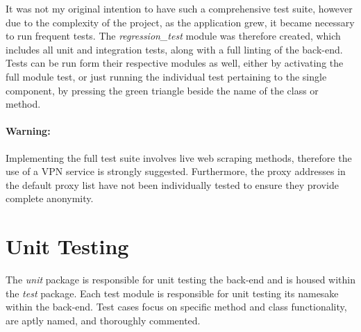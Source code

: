 \documentclass{thesis-ekf}
\theoremstyle{definition}
\theoremstyle{remark}
\begin{document}
It was not my original intention to have such a comprehensive test suite, however due to the complexity of the project, as the application grew, it became necessary to run frequent tests. The \emph{regression\_test} module was therefore created, which includes all unit and integration tests, along with a full linting of the back-end. Tests can be run form their respective modules as well, either by activating the full module test, or just running the individual test pertaining to the single component, by pressing the green triangle beside the name of the class or method.

\paragraph{Warning:} Implementing the full test suite involves live web scraping methods, therefore the use of a VPN service is strongly suggested. Furthermore, the proxy addresses in the default proxy list have not been individually tested to ensure they provide complete anonymity.

\section{Unit Testing}
The \emph{unit} package is responsible for unit testing the back-end and is housed within the \emph{test} package. Each test module is responsible for unit testing its namesake within the back-end. Test cases focus on specific method and class functionality, are aptly named, and thoroughly commented. 
\end{document}
